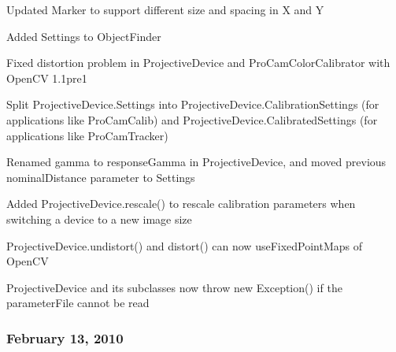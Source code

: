 \begin{DoxyItemize}
\item Updated {\ttfamily Marker} to support different size and spacing in X and Y
\item Added {\ttfamily Settings} to {\ttfamily Object\+Finder}
\item Fixed distortion problem in {\ttfamily Projective\+Device} and {\ttfamily Pro\+Cam\+Color\+Calibrator} with Open\+C\+V 1.\+1pre1
\item Split {\ttfamily Projective\+Device.\+Settings} into {\ttfamily Projective\+Device.\+Calibration\+Settings} (for applications like Pro\+Cam\+Calib) and {\ttfamily Projective\+Device.\+Calibrated\+Settings} (for applications like Pro\+Cam\+Tracker)
\item Renamed {\ttfamily gamma} to {\ttfamily response\+Gamma} in {\ttfamily Projective\+Device}, and moved previous {\ttfamily nominal\+Distance} parameter to {\ttfamily Settings}
\item Added {\ttfamily Projective\+Device.\+rescale()} to rescale calibration parameters when switching a device to a new image size
\item {\ttfamily Projective\+Device.\+undistort()} and {\ttfamily distort()} can now {\ttfamily use\+Fixed\+Point\+Maps} of Open\+C\+V
\item {\ttfamily Projective\+Device} and its subclasses now {\ttfamily throw new Exception()} if the {\ttfamily parameter\+File} cannot be read
\end{DoxyItemize}

\subsubsection*{February 13, 2010}



